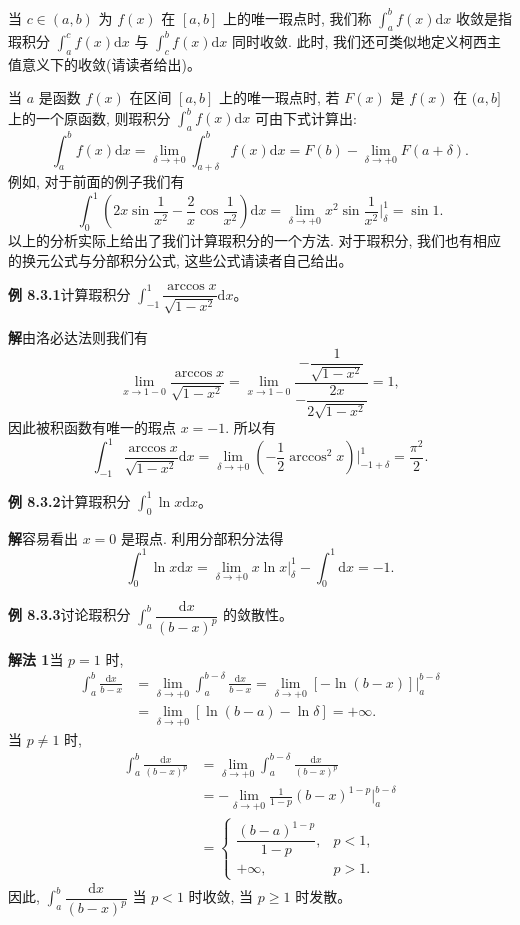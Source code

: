\documentclass[UTF8,12pt,a4paper,fontset=fandol]{ctexart}
\begin{document}
当 $c\in(a,b)$ 为 $f(x)$ 在 $[a,b]$ 上的唯一瑕点时, 我们称 $\int_a^b f(x)\mathrm dx$ 收敛是指瑕积分 $\int_a^c f(x)\mathrm dx$ 与 $\int_c^b f(x)\mathrm dx$ 同时收敛. 此时, 我们还可类似地定义柯西主值意义下的收敛(请读者给出)。

当 $a$ 是函数 $f(x)$ 在区间 $[a,b]$ 上的唯一瑕点时, 若 $F(x)$ 是 $f(x)$ 在 $(a,b]$ 上的一个原函数, 则瑕积分 $\int_a^b f(x)\mathrm dx$ 可由下式计算出:
\[
  \int_a^b f(x)\mathrm dx
  =
  \lim_{\delta\to+0}\int_{a+\delta}^b f(x)\mathrm dx
  =
  F(b)-\lim_{\delta\to+0}F(a+\delta).
\]
例如, 对于前面的例子我们有
\[
  \int_0^1\left(2x\sin\frac1{x^2}-\frac2x\cos\frac1{x^2}\right)\mathrm dx
  =
  \lim_{\delta\to+0}x^2\sin\frac1{x^2}\bigg|_\delta^1
  =
  \sin1.
\]
以上的分析实际上给出了我们计算瑕积分的一个方法. 对于瑕积分, 我们也有相应的换元公式与分部积分公式, 这些公式请读者自己给出。

\noindent\textbf{例 8.3.1}\quad 计算瑕积分 $\int_{-1}^1\dfrac{\arccos x}{\sqrt{1-x^2}}\mathrm dx$。

\noindent\textbf{解}\quad 由洛必达法则我们有
\[
  \lim_{x\to1-0}\frac{\arccos x}{\sqrt{1-x^2}}
  =
  \lim_{x\to1-0}
  \frac{-\dfrac1{\sqrt{1-x^2}}}{-\dfrac{2x}{2\sqrt{1-x^2}}}
  =
  1,
\]
因此被积函数有唯一的瑕点 $x=-1$. 所以有
\[
  \int_{-1}^1\frac{\arccos x}{\sqrt{1-x^2}}\mathrm dx
  =
  \lim_{\delta\to+0}\left(-\frac12\arccos^2x\right)\bigg|_{-1+\delta}^1
  =
  \frac{\pi^2}{2}.
\]

\noindent\textbf{例 8.3.2}\quad 计算瑕积分 $\int_0^1\ln x\mathrm dx$。

\noindent\textbf{解}\quad 容易看出 $x=0$ 是瑕点. 利用分部积分法得
\[
  \int_0^1\ln x\mathrm dx
  =
  \lim_{\delta\to+0}x\ln x\big|_\delta^1
  -
  \int_0^1\mathrm dx
  =
  -1.
\]

\noindent\textbf{例 8.3.3}\quad 讨论瑕积分 $\int_a^b\dfrac{\mathrm dx}{(b-x)^p}$ 的敛散性。

\noindent\textbf{解法 1}\quad 当 $p=1$ 时,
\[
\begin{aligned}
  \int_a^b\frac{\mathrm dx}{b-x}
  &=
  \lim_{\delta\to+0}\int_a^{b-\delta}\frac{\mathrm dx}{b-x}
  =
  \lim_{\delta\to+0}[-\ln(b-x)]\big|_a^{b-\delta}\\
  &=
  \lim_{\delta\to+0}[\ln(b-a)-\ln\delta]=+\infty.
\end{aligned}
\]
当 $p\ne1$ 时,
\[
\begin{aligned}
  \int_a^b\frac{\mathrm dx}{(b-x)^p}
  &=
  \lim_{\delta\to+0}\int_a^{b-\delta}\frac{\mathrm dx}{(b-x)^p}\\
  &=
  -\lim_{\delta\to+0}\frac1{1-p}(b-x)^{1-p}\bigg|_a^{b-\delta}\\
  &=
  \begin{cases}
    \dfrac{(b-a)^{1-p}}{1-p}, & p<1,\\
    +\infty, & p>1.
  \end{cases}
\end{aligned}
\]
因此, $\int_a^b\dfrac{\mathrm dx}{(b-x)^p}$ 当 $p<1$ 时收敛, 当 $p\geq1$ 时发散。
\end{document}
